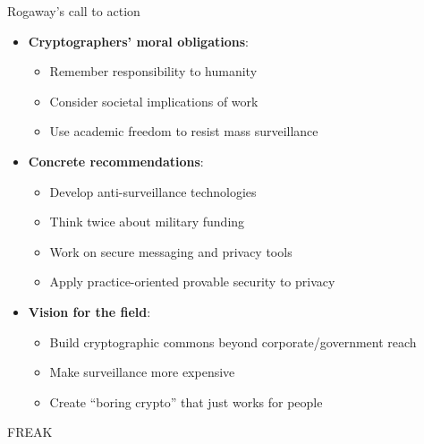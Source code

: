 \documentclass[aspectratio=169, lualatex, handout]{beamer}
\begin{document}
\begin{frame}{Rogaway's call to action}
	\begin{itemize}[<+->]
		\item \textbf{Cryptographers' moral obligations}:
		      \begin{itemize}
			      \item Remember responsibility to humanity
			      \item Consider societal implications of work
			      \item Use academic freedom to resist mass surveillance
		      \end{itemize}
		\item \textbf{Concrete recommendations}:
		      \begin{itemize}
			      \item Develop anti-surveillance technologies
			      \item Think twice about military funding
			      \item Work on secure messaging and privacy tools
			      \item Apply practice-oriented provable security to privacy
		      \end{itemize}
		\item \textbf{Vision for the field}:
		      \begin{itemize}
			      \item Build cryptographic commons beyond corporate/government reach
			      \item Make surveillance more expensive
			      \item Create ``boring crypto'' that just works for people
		      \end{itemize}
	\end{itemize}
\end{frame}

\begin{frame}{FREAK}
\end{frame}
\end{document}
